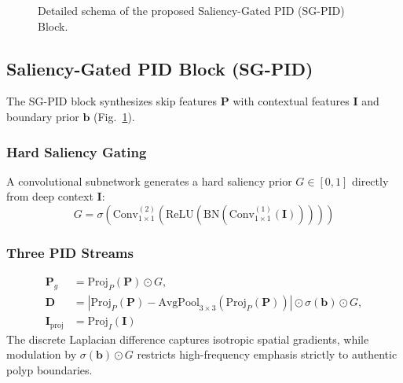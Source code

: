\documentclass[conference]{IEEEtran}
\begin{document}
\begin{figure}[t]
{
}
\caption{Detailed schema of the proposed Saliency-Gated PID (SG-PID) Block.}
\label{fig:sgpid}
\end{figure}

\subsection{Saliency-Gated PID Block (SG-PID)}
The SG-PID block synthesizes skip features $\mathbf{P}$ with contextual features $\mathbf{I}$ and boundary prior $\mathbf{b}$ (Fig.~\ref{fig:sgpid}).
\subsubsection{Hard Saliency Gating}
A convolutional subnetwork generates a hard saliency prior $G \in [0, 1]$ directly from deep context $\mathbf{I}$:
\begin{equation}
G = \sigma\left(\text{Conv}_{1\times1}^{(2)}\left(\text{ReLU}\left(\text{BN}\left(\text{Conv}_{1\times1}^{(1)}(\mathbf{I})\right)\right)\right)\right)
\end{equation}

\subsubsection{Three PID Streams}
\begin{align}
\mathbf{P}_g &= \text{Proj}_P(\mathbf{P}) \odot G, \\
\mathbf{D}   &= \left| \text{Proj}_P(\mathbf{P}) - \text{AvgPool}_{3\times3}(\text{Proj}_P(\mathbf{P})) \right| \odot \sigma(\mathbf{b}) \odot G, \\
\mathbf{I}_{\text{proj}} &= \text{Proj}_I(\mathbf{I})
\end{align}
The discrete Laplacian difference captures isotropic spatial gradients, while modulation by $\sigma(\mathbf{b}) \odot G$ restricts high-frequency emphasis strictly to authentic polyp boundaries.
\end{document}
